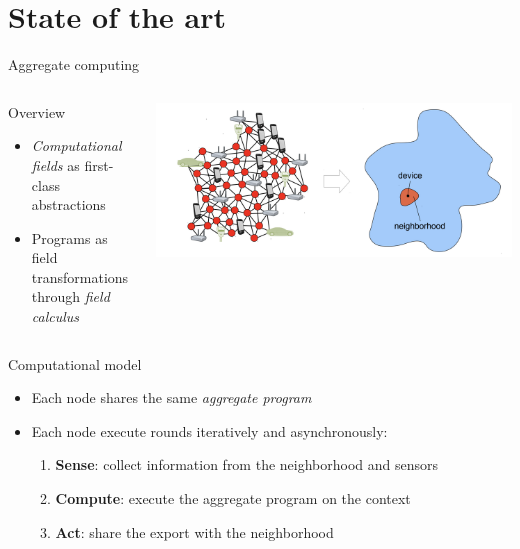 \documentclass[presentation]{beamer}\mode<presentation>{\usetheme{AMSBolognaFC}}
\begin{document}
\section{State of the art}

\begin{frame}[allowframebreaks]{Aggregate computing}
\begin{columns}
\begin{column}{0.55\textwidth}
	\begin{block}{Overview}
		\begin{itemize}
			\item \emph{Computational fields} \cite{mamei2004cofields, viroli2019distributed} as first-class abstractions
			\item Programs as field transformations through \emph{field calculus} \cite{viroli2016higher}
		\end{itemize}
	\end{block}
\end{column}
\begin{column}{0.45\textwidth}
\includegraphics[width=\textwidth]{img/ac.png}
\end{column}
\end{columns}

\centering
\begin{alertblock}{Computational model}
\begin{itemize}
	\item Each node shares the same \emph{aggregate program}
	\item Each node execute rounds iteratively and asynchronously:
	\begin{enumerate}
		\item \textbf{Sense}: collect information from the neighborhood and sensors
		\item \textbf{Compute}: execute the aggregate program on the context
		\item \textbf{Act}: share the export with the neighborhood
	\end{enumerate}
\end{itemize}
\end{alertblock}


\end{frame}
\end{document}
